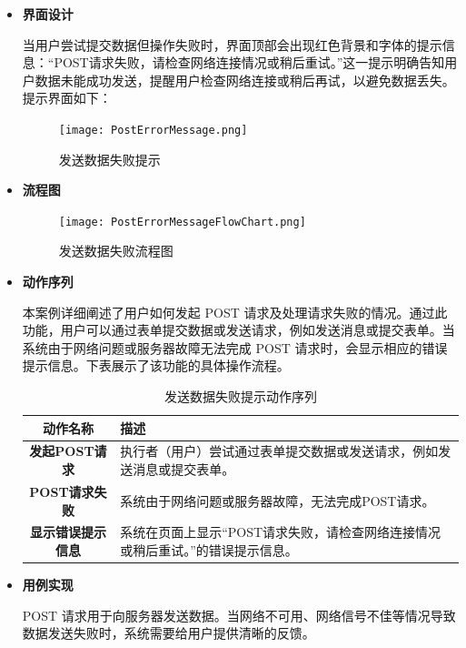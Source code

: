 \begin{itemize}
	
	\item \textbf{界面设计}
	
	当用户尝试提交数据但操作失败时，界面顶部会出现红色背景和字体的提示信息：“POST请求失败，请检查网络连接情况或稍后重试。”这一提示明确告知用户数据未能成功发送，提醒用户检查网络连接或稍后再试，以避免数据丢失。提示界面如下：
	
	\begin{figure}[H]
		\centering
		\texttt{[image: PostErrorMessage.png]}
		\caption{发送数据失败提示}
		\label{PostErrorMessage}
	\end{figure}	
	
	\item \textbf{流程图}
	
	\begin{figure}[H]
		\centering
		\texttt{[image: PostErrorMessageFlowChart.png]}
		\caption{发送数据失败流程图}
		\label{fig:post}
	\end{figure}
	
	
	\item \textbf{动作序列}
	
	本案例详细阐述了用户如何发起 POST 请求及处理请求失败的情况。通过此功能，用户可以通过表单提交数据或发送请求，例如发送消息或提交表单。当系统由于网络问题或服务器故障无法完成 POST 请求时，会显示相应的错误提示信息。下表展示了该功能的具体操作流程。
	
	\begin{table}[H]
		\centering
		\caption{发送数据失败提示动作序列}
		\renewcommand\arraystretch{1.5}
		\begin{tabular}{|c|>{\raggedright\arraybackslash}p{10cm}|}
			\hline
			\textbf{动作名称} & \textbf{描述} \\ \hline
			\textbf{发起POST请求} & 执行者（用户）尝试通过表单提交数据或发送请求，例如发送消息或提交表单。 \\ \hline
			\textbf{POST请求失败} & 系统由于网络问题或服务器故障，无法完成POST请求。 \\ \hline
			\textbf{显示错误提示信息} & 系统在页面上显示“POST请求失败，请检查网络连接情况或稍后重试。”的错误提示信息。 \\ \hline
		\end{tabular}
	\end{table}
	
	\item \textbf{用例实现}
	
	POST 请求用于向服务器发送数据。当网络不可用、网络信号不佳等情况导致数据发送失败时，系统需要给用户提供清晰的反馈。
	

\end{itemize}
